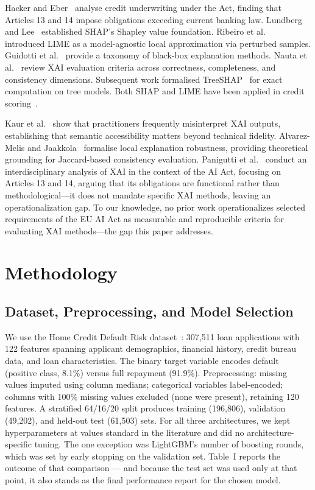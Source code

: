 \documentclass[conference]{IEEEtran}
\begin{document}
Hacker and Eber~\cite{b3} analyse credit underwriting under the Act,
finding that Articles 13 and 14 impose obligations exceeding current
banking law. Lundberg and Lee~\cite{b4} established SHAP's
Shapley value foundation. Ribeiro et al.~\cite{b5}
introduced LIME as a model-agnostic local approximation via perturbed
samples. Guidotti et al.~\cite{b8}
provide a taxonomy of black-box explanation methods. Nauta et
al.~\cite{b9} review XAI evaluation criteria across
correctness, completeness, and consistency dimensions. Subsequent work
formalised TreeSHAP~\cite{b11} for exact computation on
tree models. Both SHAP and LIME have been applied in credit
scoring~\cite{b15}.

Kaur et al.~\cite{b6} show that practitioners frequently
misinterpret XAI outputs, establishing that semantic accessibility
matters beyond technical fidelity. Alvarez-Melis and
Jaakkola~\cite{b14} formalise local explanation robustness, providing
theoretical grounding for Jaccard-based consistency evaluation.
Panigutti et al.~\cite{b7} conduct an interdisciplinary analysis of XAI
in the context of the AI Act, focusing on Articles 13 and 14, arguing
that its obligations are functional rather than methodological---it does
not mandate specific XAI methods, leaving an operationalization gap. To
our knowledge, no prior work operationalizes selected requirements of
the EU AI Act as measurable and reproducible criteria for evaluating
XAI methods---the gap this paper addresses.

\section{Methodology}

\subsection{Dataset, Preprocessing, and Model Selection}

We use the Home Credit Default Risk dataset~\cite{b10}: 307,511 loan
applications with 122 features spanning applicant demographics,
financial history, credit bureau data, and loan characteristics. The
binary target variable encodes default (positive class, 8.1\%) versus
full repayment (91.9\%). Preprocessing: missing values imputed using
column medians; categorical variables label-encoded; columns with
100\% missing values excluded (none were present), retaining 120
features. A stratified 64/16/20 split produces training (196,806),
validation (49,202), and held-out test (61,503) sets. For all
three architectures, we kept hyperparameters at values standard in the
literature and did no architecture-specific tuning. The one exception
was LightGBM's number of boosting rounds, which was set by early
stopping on the validation set. Table~I reports the outcome of that
comparison --- and because the test set was used only at that point,
it also stands as the final performance report for the chosen model.
\end{document}
